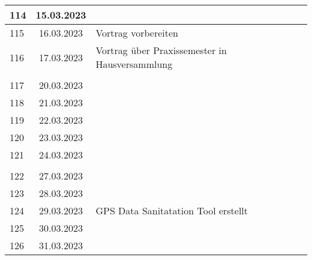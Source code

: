 \begin{longtable}{|l|c|l|}
114 & 15.03.2023    &                                                       \\ \hline
115 & 16.03.2023    &  Vortrag vorbereiten                                                     \\ \hline
116 & 17.03.2023    &  Vortrag über Praxissemester in Hausversammlung                                                     \\ \hline
&               &                                                       \\ \hline 
117 & 20.03.2023    &                                                       \\ \hline
118 & 21.03.2023    &                                                       \\ \hline
119 & 22.03.2023    &                                                       \\ \hline
120 & 23.03.2023    &                                                       \\ \hline
121 & 24.03.2023    &                                                       \\ \hline
&               &                                                       \\ \hline 
122 & 27.03.2023    &                                                       \\ \hline
123 & 28.03.2023    &                                                       \\ \hline
124 & 29.03.2023    &  GPS Data Sanitatation Tool erstellt                                                  \\ \hline
125 & 30.03.2023    &                                                       \\ \hline
126 & 31.03.2023    &                                                       \\ \hline












\end{longtable}